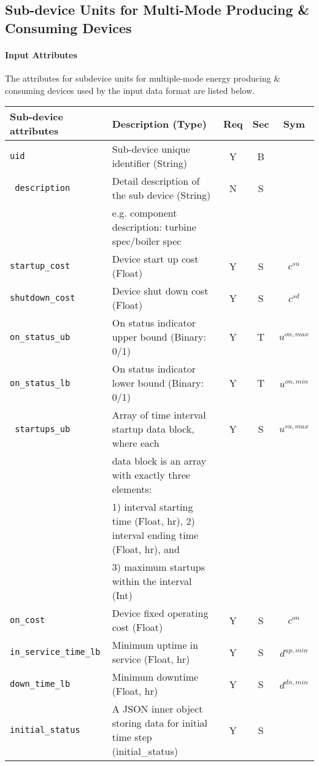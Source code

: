 \documentclass{article}
\begin{document}
\subsection{Sub-device Units for Multi-Mode Producing \& Consuming Devices}
\label{nom:gen_sub}
\paragraph{Input Attributes}
The attributes for
subdevice units for multiple-mode energy producing \& consuming devices used by the input data format are listed below.

\begin{center}
\small
{\color{red}
\begin{tabular}{ l | l | c | c | c |}
Sub-device attributes & Description (Type) & Req & Sec & Sym\\
\hline
  {\tt uid} & Sub-device unique identifier (String) & Y & B &  \\
  {\tt\color{red} description} & Detail description of the sub device  (String) & N & S & \\
      &e.g. component description: turbine spec/boiler spec  &  &  & \\
  {\tt startup\_cost} & Device start up cost (Float) & Y & S & $c^{su}$\\
  {\tt shutdown\_cost} & Device shut down cost (Float) & Y & S & $c^{sd}$\\
  {\tt on\_status\_ub} & On status indicator upper bound (Binary: 0/1) & Y & T & $u^{on,max}$\\
  {\tt on\_status\_lb} & On status indicator lower bound (Binary: 0/1) & Y & T & $u^{on,min}$\\

  {\tt\color{red} startups\_ub} & {\color{red} Array of time interval startup data block, where each} & Y & S & $u^{su,max}$\\
                                & {\color{red} data block is an array with exactly three elements:} &   &   & \\
                                & {\color{red} 1) interval starting time (Float, hr), 2) interval ending time (Float, hr), and } &   &   & \\
                                & {\color{red} 3) maximum startups within the interval (Int) } &   &   & \\
  {\tt on\_cost} & Device fixed operating cost (Float) & Y & S & $c^{on}$\\
  {\tt in\_service\_time\_lb} & Minimum uptime in service (Float, hr) & Y & S & $d^{up,min}$\\
  {\tt down\_time\_lb} & Minimum downtime (Float, hr) & Y & S & $d^{dn,min}$\\

  {\tt initial\_status} & A JSON inner object storing data for initial time step (initial\_status) & Y & S &  \\
  \hline
\end{tabular}
}
\end{center}
\end{document}
